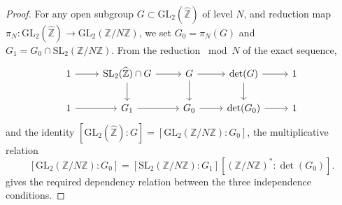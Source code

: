 \documentclass[10pt,a4paper]{amsart}
\newcommand{\GL}{\mathrm{GL}}
\newcommand{\SL}{\mathrm{SL}}
\newcommand{\ZZ}{\mathbb{Z}}
\newcommand{\ZZhat}{\widehat{\ZZ}}
\begin{document}
\begin{proof}
  For any open subgroup $G \subset \GL_2(\ZZhat)$ of level $N$,
  and reduction map $\pi_N: \GL_2(\ZZhat) \to \GL_2(\ZZ/N\ZZ)$,
  we set $G_0 = \pi_N(G)$ and $G_1 = G_0 \cap \SL_2(\ZZ/N\ZZ)$.
  From the reduction $\bmod N$ of the exact sequence,
  $$
  \begin{tikzcd}
    1 \arrow[r] &
    \SL_2(\ZZhat) \cap G \arrow[r] \arrow[d] &
    G \arrow[r] \arrow[d] &
    \det(G) \arrow[r] \arrow[d] & 1 \\
    1 \arrow[r] & G_1 \arrow[r] & G_0 \arrow[r] & \det(G_0) \arrow[r] & 1
  \end{tikzcd}
  $$
  and the identity $[\GL_2(\ZZhat):G] = [\GL_2(\ZZ/N\ZZ):G_0]$, the
  multiplicative relation
  $$
  [\GL_2(\ZZ/N\ZZ):G_0] = [\SL_2(\ZZ/N\ZZ):G_1][(\ZZ/N\ZZ)^*:\det(G_0)].
  $$
  gives the required dependency relation between the three independence conditions.
\end{proof}
\end{document}
